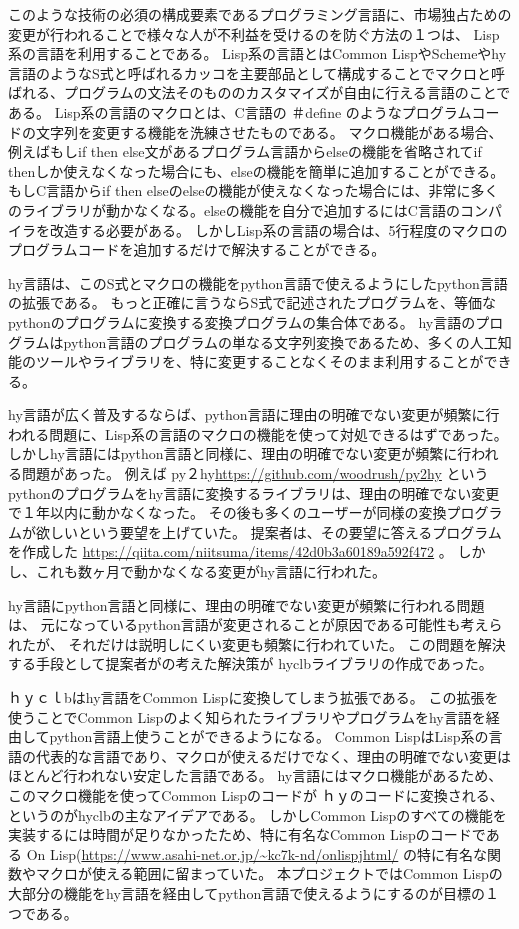 \documentclass[11pt,a4j,dvipdfmx]{jarticle} 					%
\newcommand{\研究課題名}{人工知能のためのLispシステム}
\newcommand{\研究機関名}{大阪公立大学工業高等専門学校}
\newcommand{\研究代表者氏名}{新妻弘崇}
\newcommand{\研究期間の最終元号年度}{11}  %
\begin{document}
このような技術の必須の構成要素であるプログラミング言語に、市場独占ための変更が行われることで様々な人が不利益を受けるのを防ぐ方法の１つは、 Lisp系の言語を利用することである。
Lisp系の言語とはCommon LispやSchemeやhy言語のようなS式と呼ばれるカッコを主要部品として構成することでマクロと呼ばれる、プログラムの文法そのもののカスタマイズが自由に行える言語のことである。
Lisp系の言語のマクロとは、C言語の ＃define のようなプログラムコードの文字列を変更する機能を洗練させたものである。
マクロ機能がある場合、例えばもしif then else文があるプログラム言語からelseの機能を省略されてif thenしか使えなくなった場合にも、elseの機能を簡単に追加することができる。
もしC言語からif then elseのelseの機能が使えなくなった場合には、非常に多くのライブラリが動かなくなる。elseの機能を自分で追加するにはC言語のコンパイラを改造する必要がある。
しかしLisp系の言語の場合は、5行程度のマクロのプログラムコードを追加するだけで解決することができる。

hy言語は、このS式とマクロの機能をpython言語で使えるようにしたpython言語の拡張である。
もっと正確に言うならS式で記述されたプログラムを、等価なpythonのプログラムに変換する変換プログラムの集合体である。
hy言語のプログラムはpython言語のプログラムの単なる文字列変換であるため、多くの人工知能のツールやライブラリを、特に変更することなくそのまま利用することができる。

hy言語が広く普及するならば、python言語に理由の明確でない変更が頻繁に行われる問題に、Lisp系の言語のマクロの機能を使って対処できるはずであった。
しかしhy言語にはpython言語と同様に、理由の明確でない変更が頻繁に行われる問題があった。
例えば py２hy\url{https://github.com/woodrush/py2hy}
というpythonのプログラムをhy言語に変換するライブラリは、理由の明確でない変更で１年以内に動かなくなった。
その後も多くのユーザーが同様の変換プログラムが欲しいという要望を上げていた。
提案者は、その要望に答えるプログラムを作成した
\url{ https://qiita.com/niitsuma/items/42d0b3a60189a592f472} 。
しかし、これも数ヶ月で動かなくなる変更がhy言語に行われた。


hy言語にpython言語と同様に、理由の明確でない変更が頻繁に行われる問題は、
元になっているpython言語が変更されることが原因である可能性も考えられたが、
それだけは説明しにくい変更も頻繁に行われていた。
この問題を解決する手段として提案者がの考えた解決策が hyclbライブラリの作成であった。

ｈｙｃｌbはhy言語をCommon Lispに変換してしまう拡張である。
この拡張を使うことでCommon Lispのよく知られたライブラリやプログラムをhy言語を経由してpython言語上使うことができるようになる。
Common LispはLisp系の言語の代表的な言語であり、マクロが使えるだけでなく、理由の明確でない変更はほとんど行われない安定した言語である。
hy言語にはマクロ機能があるため、このマクロ機能を使ってCommon Lispのコードが ｈｙのコードに変換される、というのがhyclbの主なアイデアである。
しかしCommon Lispのすべての機能を実装するには時間が足りなかったため、特に有名なCommon Lispのコードである On Lisp(\url{https://www.asahi-net.or.jp/~kc7k-nd/onlispjhtml/}
の特に有名な関数やマクロが使える範囲に留まっていた。
本プロジェクトではCommon Lispの大部分の機能をhy言語を経由してpython言語で使えるようにするのが目標の１つである。
\end{document}
